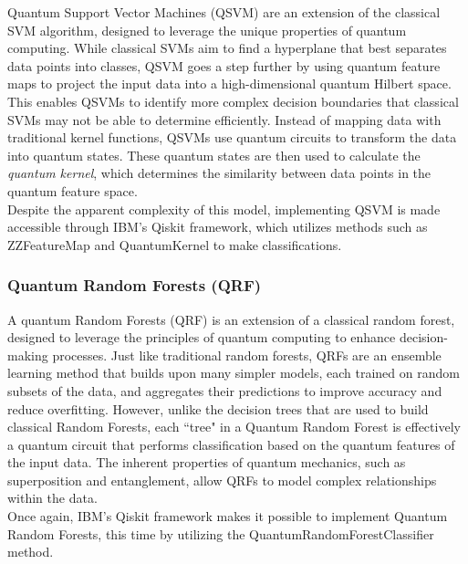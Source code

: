 \documentclass[11pt, oneside]{article}   	%
\begin{document}
\hspace{10mm}Quantum Support Vector Machines (QSVM) are an extension of the classical SVM algorithm, designed to leverage the unique properties of quantum computing. While classical SVMs aim to find a hyperplane that best separates data points into classes, QSVM goes a step further by using quantum feature maps to project the input data into a high-dimensional quantum Hilbert space. This enables QSVMs to identify more complex decision boundaries that classical SVMs may not be able to determine efficiently. Instead of mapping data with traditional kernel functions, QSVMs use quantum circuits to transform the data into quantum states. These quantum states are then used to calculate the \textit{quantum kernel}, which determines the similarity between data points in the quantum feature space. \\

\noindent\hspace{10mm}Despite the apparent complexity of this model, implementing QSVM is made accessible through IBM’s Qiskit framework, which utilizes methods such as ZZFeatureMap and QuantumKernel to make classifications.


\subsubsection{Quantum Random Forests (QRF)}

\hspace{10mm} A quantum Random Forests (QRF) is an extension of a classical random forest, designed to leverage the principles of quantum computing to enhance decision-making processes. Just like traditional random forests, QRFs are an ensemble learning method that builds upon many simpler models, each trained on random subsets of the data, and aggregates their predictions to improve accuracy and reduce overfitting. However, unlike the decision trees that are used to build classical Random Forests, each ``tree" in a Quantum Random Forest is effectively a quantum circuit that performs classification based on the quantum features of the input data. The inherent properties of quantum mechanics, such as superposition and entanglement, allow QRFs to model complex relationships within the data. \\

\noindent\hspace{10mm} Once again, IBM’s Qiskit framework makes it possible to implement Quantum Random Forests, this time by utilizing the QuantumRandomForestClassifier method.
\end{document}
